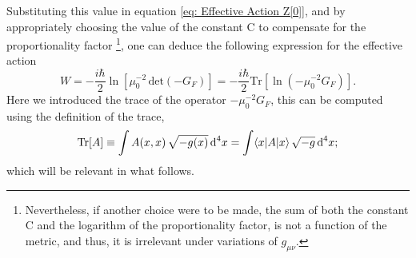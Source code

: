 Substituting this value in equation \ref{eq: Effective Action Z[0]}, and by appropriately choosing the value of the constant C to compensate for the proportionality factor \footnote{Nevertheless, if another choice were to be made, the sum of both the constant C and the logarithm of the proportionality factor, is not a function of the metric, and thus, it is irrelevant under variations of $g_{\mu\nu}$.}, one can deduce the following expression for the effective action
\begin{equation}
	W=-\frac{i\hbar}{2}\ln\left[\mu_0^{-2} \,\text{det}\left(-G_F\right)\right]=-\frac{i\hbar}{2}\text{Tr}\left[\ln\left(-\mu_0^{-2}G_F\right)\right].
\end{equation}
Here we introduced the trace of the operator $-\mu_0^{-2}G_F$, this can be computed using the definition of the trace,
\begin{equation}
	\text{Tr}[A]\equiv \int A(x,x)\,\sqrt{-g(x)}\,\text{d}^4x=\int \langle x|A|x\rangle\,\sqrt{-g}\,\text{d}^4x;
\end{equation}
which will be relevant in what follows.
